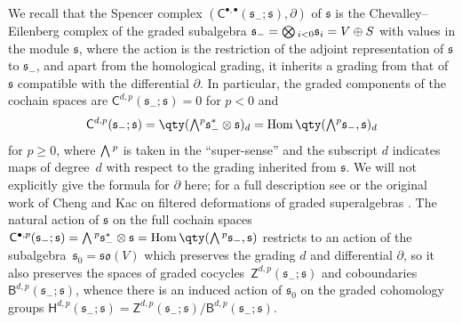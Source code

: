 \documentclass[pdftex]{sigma}
\numberwithin{equation}{section}
\newcommand{\fs}{\mathfrak{s}}
\newcommand{\fso}{\mathfrak{so}}
\newcommand{\ssB}{\mathsf{B}}
\newcommand{\ssC}{\mathsf{C}}
\newcommand{\ssH}{\mathsf{H}}
\newcommand{\ssZ}{\mathsf{Z}}
\newcommand{\Wedge}{\mathchoice{{\textstyle\bigwedge}}{\bigwedge}{\bigwedge}{\bigwedge}}	%
\newcommand{\Otimes}{\mathchoice{{\textstyle\bigotimes}}{\bigotimes}{\bigotimes}{\bigotimes}}
\newcommand{\1}{\mathbbm{1}}
\DeclareMathOperator{\Hom}{Hom}
\begin{document}
We recall that the Spencer complex $(\ssC^{\bullet,\bullet}(\fs_-;\fs),\partial)$ of $\fs$ is the Chevalley--Eilenberg complex of the graded subalgebra $\fs_-=\Otimes_{i<0}\fs_i=V\oplus S$ with values in the module $\fs$, where the action is the restriction of the adjoint representation of $\fs$ to $\fs_-$, and apart from the homological grading, it inherits a grading from that of $\fs$ compatible with the differential $\partial$. In particular, the graded components of the cochain spaces are $\ssC^{d,p}(\fs_-;\fs)=0$ for $p<0$ and
\[
	\ssC^{d,p}(\fs_-;\fs) = \qty(\Wedge^p \fs_-^*\otimes \fs)_d = \Hom\qty(\Wedge^p \fs_-,\fs)_d
\]
for $p\geq 0$, where $\Wedge^p$ is taken in the ``super-sense'' and the subscript $d$ indicates maps of degree~$d$ with respect to the grading inherited from $\fs$. We will not explicitly give the formula for $\partial$ here; for a full description see \cite[Section~2.2]{Beckett2024_2} or the original work of Cheng and Kac on filtered deformations of graded superalgebras \cite{Cheng1998}. The natural action of $\fs$ on the full cochain spaces~$\ssC^{\bullet,p}(\fs_-;\fs) = \Wedge^p \fs_-^*\otimes \fs = \Hom\qty(\Wedge^p \fs_-,\fs)$ restricts to an action of the subalgebra~$\fs_0=\fso(V)$ which preserves the grading $d$ and differential $\partial$, so it also preserves the spaces of graded cocycles~$\ssZ^{d,p}(\fs_-;\fs)$ and coboundaries $\ssB^{d,p}(\fs_-;\fs)$, whence there is an induced action of $\fs_0$ on the graded cohomology groups $\ssH^{d,p}(\fs_-;\fs)=\ssZ^{d,p}(\fs_-;\fs)/\ssB^{d,p}(\fs_-;\fs)$.
\end{document}
